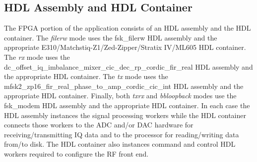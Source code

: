 \subsection{HDL Assembly and HDL Container}
\noindent The FPGA portion of the application consists of an HDL assembly and the HDL container. The \textit{filerw} mode uses the fsk\_filerw HDL assembly and the appropriate E310/Matchstiq-Z1/Zed-Zipper/Stratix IV/ML605 HDL container. The \textit{rx} mode uses the dc\_offset\_iq\_imbalance\_mixer\_\-cic\_dec\_rp\_cordic\_fir\_real HDL assembly and the appropriate HDL container. The \textit{tx} mode uses the mfsk2\_zp16\_fir\_real\_phase\_to\_amp\_cordic\_cic\_int HDL assembly and the appropriate HDL container. Finally, both \textit{txrx} and \textit{bbloopback} modes use the fsk\_modem HDL assembly and the appropriate HDL container. In each case the HDL assembly instances the signal processing workers while the HDL container connects those workers to the ADC and/or DAC hardware for receiving/transmitting IQ data and to the processor for reading/writing data from/to disk. The HDL container also instances command and control HDL workers required to configure the RF front end.
